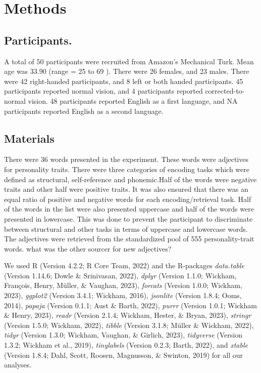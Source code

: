 \documentclass[
  man,floatsintext]{apa6}
\begin{document}
\hypertarget{methods}{%
\section{Methods}\label{methods}}

\hypertarget{participants.}{%
\subsection{Participants.}\label{participants.}}

A total of 50 participants were recruited from Amazon's Mechanical Turk. Mean age was 33.90 (range = 25 to 69 ). There were 26 females, and 23 males. There were 42 right-handed participants, and 8 left or both handed participants. 45 participants reported normal vision, and 4 participants reported corrected-to-normal vision. 48 participants reported English as a first language, and NA participants reported English as a second language.

\hypertarget{materials}{%
\subsection{Materials}\label{materials}}

There were 36 words presented in the experiment. These words were adjectives for personality traits. There were three categories of encoding tasks which were defined as structural, self-reference and phonemic.Half of the words were negative traits and other half were positive traits. It was also ensured that there was an equal ratio of positive and negative words for each encoding/retrieval task. Half of the words in the list were also presented uppercase and half of the words were presented in lowercase. This was done to prevent the participant to discriminate between structural and other tasks in terms of uppercase and lowercase words. The adjectives were retrieved from the standardized pool of 555 personality-trait words. what was the other sourcer for new adjectives?

We used R (Version 4.2.2; R Core Team, 2022) and the R-packages \emph{data.table} (Version 1.14.6; Dowle \& Srinivasan, 2022), \emph{dplyr} (Version 1.1.0; Wickham, François, Henry, Müller, \& Vaughan, 2023), \emph{forcats} (Version 1.0.0; Wickham, 2023), \emph{ggplot2} (Version 3.4.1; Wickham, 2016), \emph{jsonlite} (Version 1.8.4; Ooms, 2014), \emph{papaja} (Version 0.1.1; Aust \& Barth, 2022), \emph{purrr} (Version 1.0.1; Wickham \& Henry, 2023), \emph{readr} (Version 2.1.4; Wickham, Hester, \& Bryan, 2023), \emph{stringr} (Version 1.5.0; Wickham, 2022), \emph{tibble} (Version 3.1.8; Müller \& Wickham, 2022), \emph{tidyr} (Version 1.3.0; Wickham, Vaughan, \& Girlich, 2023), \emph{tidyverse} (Version 1.3.2; Wickham et al., 2019), \emph{tinylabels} (Version 0.2.3; Barth, 2022), and \emph{xtable} (Version 1.8.4; Dahl, Scott, Roosen, Magnusson, \& Swinton, 2019) for all our analyses.
\end{document}
